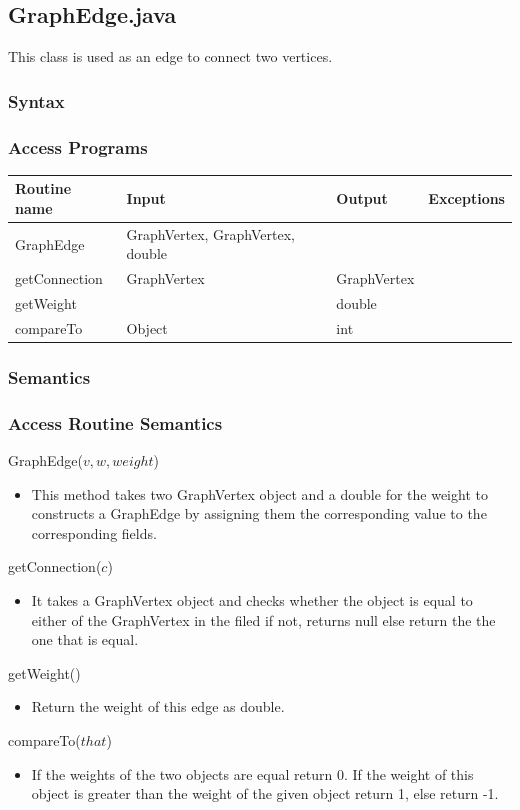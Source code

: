 \documentclass[12pt,fleqn]{article}
\begin{document}
\subsection*{GraphEdge.java}\label{edge}
This class is used as an edge to connect two vertices.
\subsubsection* {Syntax}

\subsubsection* {Access Programs}
\begin{tabular}{| l | l | l | l |}
\hline
\textbf{Routine name} & \textbf{Input} & \textbf{Output} & \textbf{Exceptions}\\
\hline
GraphEdge & GraphVertex, GraphVertex, double & ~ & ~\\
\hline
getConnection & GraphVertex & GraphVertex & ~\\
\hline
getWeight & ~ & double & ~\\
\hline
compareTo & Object & int & ~\\
\hline
\end{tabular}

\subsubsection*{Semantics}
\subsubsection*{Access Routine Semantics}
\noindent GraphEdge($v, w, weight$)
\begin{itemize}
\item This method takes two GraphVertex object and a double for the weight to constructs a GraphEdge by
assigning them the corresponding value to the corresponding fields.
\end{itemize}
\noindent getConnection($c$)
\begin{itemize}
\item It takes a GraphVertex object and checks whether the object is equal to either of the GraphVertex in the
filed if not, returns null else return the the one that is equal.
\end{itemize}
\noindent getWeight()
\begin{itemize}
\item Return the weight of this edge as double.
\end{itemize}
\noindent compareTo($that$)
\begin{itemize}
\item If the weights of the two objects are equal return 0. If the weight of this object is greater than the weight
of the given object return 1, else return -1.
\end{itemize}
\end{document}
